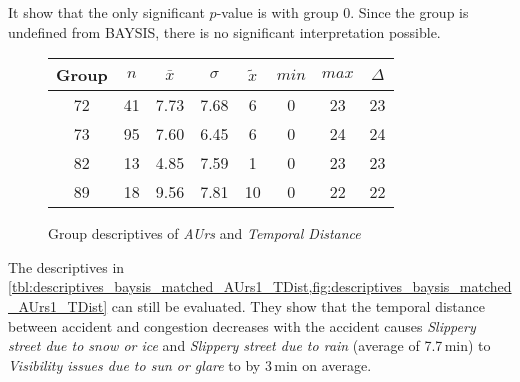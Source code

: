 It show that the only significant $p$-value is with group 0. Since the group is undefined from BAYSIS, there is no significant interpretation possible.
\begin{figure}[ht!]
	\centering
	\begin{minipage}{0.5\textwidth}
		\tiny
		\setlength{\tabcolsep}{4pt}
		\centering
		\begin{tabular}{c|c|c|c|c|c|c|c}
			\toprule
			Group & $n$ & $\bar{x}$ & $\sigma$ & $\tilde{x}$ & $min$ & $max$ & $\Delta$ \\
			\midrule
			72 & 41 & 7.73 & 7.68 & 6  & 0 & 23 & 23 \\ 
			73 & 95 & 7.60 & 6.45 & 6  & 0 & 24 & 24 \\ 
			82 & 13 & 4.85 & 7.59 & 1  & 0 & 23 & 23 \\  
			89 & 18 & 9.56 & 7.81 & 10 & 0 & 22 & 22 \\ 
			\bottomrule
		\end{tabular}
		\label{tbl:descriptives_baysis_matched_AUrs1_TDist}
	\end{minipage}%
	\begin{minipage}{0.55\textwidth}
		\data 
        \pgfplotstablesort[sort key=mean, sort cmp=float >]{\datasorted}{\data}
        \tiny
        \centering
		\label{fig:descriptives_baysis_matched_AUrs1_TDist}
	\end{minipage}%
	\caption{Group descriptives of \textit{AUrs} and \textit{Temporal Distance}}
\end{figure}
The descriptives in \cref{tbl:descriptives_baysis_matched_AUrs1_TDist,fig:descriptives_baysis_matched_AUrs1_TDist} can still be evaluated. They show that the temporal distance between accident and congestion decreases with the accident causes \textit{Slippery street due to snow or ice} and \textit{Slippery street due to rain} (average of 7.7\,min) to \textit{Visibility issues due to sun or glare} to by 3\,min on average.

